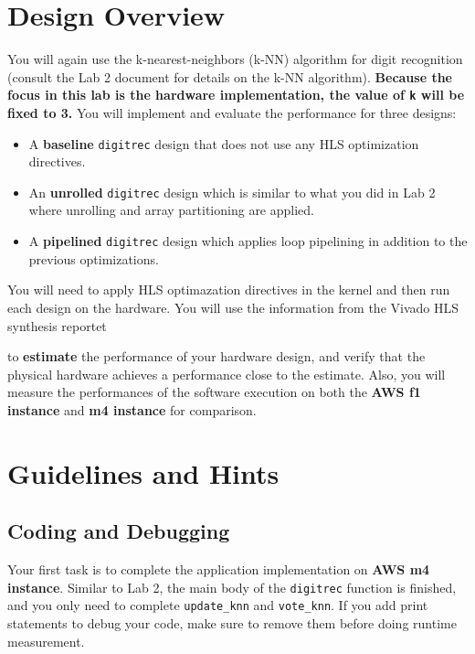 \documentclass[paper=letter, fontsize=10pt]{scrartcl} %
\numberwithin{equation}{section} %
\numberwithin{figure}{section} %
\numberwithin{table}{section} %
\begin{document}

\section{Design Overview}
You will again use the k-nearest-neighbors (k-NN) algorithm for digit recognition
(consult the Lab 2 document for details on the k-NN algorithm).
\textbf{Because the focus in this lab is the hardware implementation, the value of \texttt{k} will be fixed to 3.}
You will implement and evaluate the performance for three designs:
\begin{itemize}
  \item A \textbf{baseline} \texttt{digitrec} design that does not use any HLS optimization directives. 
  \item An \textbf{unrolled} \texttt{digitrec} design which is similar to what you did in Lab 2 where unrolling and array partitioning are applied.
  \item A \textbf{pipelined} \texttt{digitrec} design which applies loop pipelining in addition to the previous optimizations.
\end{itemize}
You will need to apply HLS optimazation directives in the kernel and then run each design on the hardware.
You will use the information from the Vivado HLS synthesis reportet

to \textbf{estimate} the performance of your hardware design, and verify that the
physical hardware achieves a performance close to the estimate.
Also, you will measure the performances of the software execution 
on both the \textbf{AWS f1 instance} and \textbf{m4 instance} for comparison.

\section{Guidelines and Hints}
\subsection{Coding and Debugging}
Your first task is to complete the application implementation
on \textbf{AWS m4 instance}. Similar to Lab 2, the main body of the \texttt{digitrec} function is finished,
and you only need to complete \texttt{update\_knn} and \texttt{vote\_knn}.  
If you add print statements to debug your code, make sure to remove them before
doing runtime measurement.
\end{document}
